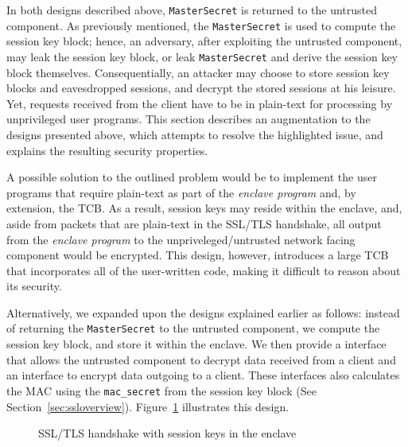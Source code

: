 \documentclass[../../main.tex]{subfiles}
\begin{document}
In both designs described above, \texttt{MasterSecret} is returned to
the untrusted component. As previously mentioned, the
\texttt{MasterSecret} is used to compute the session key block; hence,
an adversary, after exploiting the untrusted component, may leak the
session key block, or leak \texttt{MasterSecret} and derive the
session key block themselves. Consequentially, an attacker may choose
to store session key blocks and eavesdropped sessions, and decrypt the
stored sessions at his leisure. Yet, requests received from the client
have to be in plain-text for processing by unprivileged user programs.
This section describes an augmentation to the designs presented above,
which attempts to resolve the highlighted issue, and explains the
resulting security properties.

A possible solution to the outlined problem would be to implement the
user programs that require plain-text as part of the \textit{enclave
  program} and, by extension, the TCB. As a result, session keys may
reside within the enclave, and, aside from packets that are plain-text
in the SSL/TLS handshake, all output from the \textit{enclave program}
to the unpriveleged/untrusted network facing component would be
encrypted. This design, however, introduces a large TCB that
incorporates all of the user-written code, making it difficult to
reason about its security.

Alternatively, we expanded upon the designs explained earlier as
follows: instead of returning the \texttt{MasterSecret} to the
untrusted component, we compute the session key block, and store it
within the enclave. We then provide a interface that allows the
untrusted component to decrypt data received from a client and an
interface to encrypt data outgoing to a client. These interfaces also
calculates the MAC using the \texttt{mac\_secret} from the session key
block (See Section~\ref{sec:ssloverview}).
Figure~\ref{fig:keys-inside} illustrates this design.

\begin{figure}[H]
  \centering
  
  \caption{SSL/TLS handshake with session keys in the enclave}
  \label{fig:keys-inside}
\end{figure}

\end{document}
